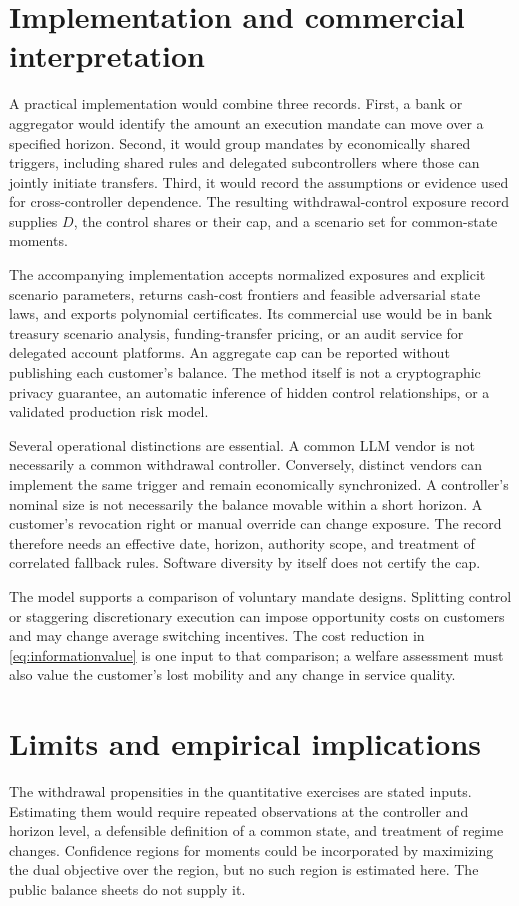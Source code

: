 \documentclass[11pt]{article}
\theoremstyle{definition}\newtheorem{definition}[theorem]{Definition}
\begin{document}
\section{Implementation and commercial interpretation}
A practical implementation would combine three records. First, a bank or aggregator would identify the amount an execution mandate can move over a specified horizon. Second, it would group mandates by economically shared triggers, including shared rules and delegated subcontrollers where those can jointly initiate transfers. Third, it would record the assumptions or evidence used for cross-controller dependence. The resulting withdrawal-control exposure record supplies \(D\), the control shares or their cap, and a scenario set for common-state moments.

The accompanying implementation accepts normalized exposures and explicit scenario parameters, returns cash-cost frontiers and feasible adversarial state laws, and exports polynomial certificates. Its commercial use would be in bank treasury scenario analysis, funding-transfer pricing, or an audit service for delegated account platforms. An aggregate cap can be reported without publishing each customer's balance. The method itself is not a cryptographic privacy guarantee, an automatic inference of hidden control relationships, or a validated production risk model.

Several operational distinctions are essential. A common LLM vendor is not necessarily a common withdrawal controller. Conversely, distinct vendors can implement the same trigger and remain economically synchronized. A controller's nominal size is not necessarily the balance movable within a short horizon. A customer's revocation right or manual override can change exposure. The record therefore needs an effective date, horizon, authority scope, and treatment of correlated fallback rules. Software diversity by itself does not certify the cap.

The model supports a comparison of voluntary mandate designs. Splitting control or staggering discretionary execution can impose opportunity costs on customers and may change average switching incentives. The cost reduction in \eqref{eq:informationvalue} is one input to that comparison; a welfare assessment must also value the customer's lost mobility and any change in service quality.

\section{Limits and empirical implications}
The withdrawal propensities in the quantitative exercises are stated inputs. Estimating them would require repeated observations at the controller and horizon level, a defensible definition of a common state, and treatment of regime changes. Confidence regions for moments could be incorporated by maximizing the dual objective over the region, but no such region is estimated here. The public balance sheets do not supply it.
\end{document}
